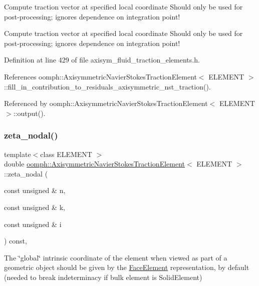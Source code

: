 Compute traction vector at specified local coordinate Should only be used for post-\/processing; ignores dependence on integration point! 

Compute traction vector at specified local coordinate Should only be used for post-\/processing; ignores dependence on integration point! 

Definition at line 429 of file axisym\+\_\+fluid\+\_\+traction\+\_\+elements.\+h.



References oomph\+::\+Axisymmetric\+Navier\+Stokes\+Traction\+Element$<$ E\+L\+E\+M\+E\+N\+T $>$\+::fill\+\_\+in\+\_\+contribution\+\_\+to\+\_\+residuals\+\_\+axisymmetric\+\_\+nst\+\_\+traction().



Referenced by oomph\+::\+Axisymmetric\+Navier\+Stokes\+Traction\+Element$<$ E\+L\+E\+M\+E\+N\+T $>$\+::output().

\mbox{\label{classoomph_1_1AxisymmetricNavierStokesTractionElement_a07065fabd6d28ac9efb7e50bc628a8e0}} 
\subsubsection{\texorpdfstring{zeta\+\_\+nodal()}{zeta\_nodal()}}
{\footnotesize\ttfamily template$<$class E\+L\+E\+M\+E\+NT $>$ \\
double \hyperlink{classoomph_1_1AxisymmetricNavierStokesTractionElement}{oomph\+::\+Axisymmetric\+Navier\+Stokes\+Traction\+Element}$<$ E\+L\+E\+M\+E\+NT $>$\+::zeta\+\_\+nodal (\begin{DoxyParamCaption}\item[{const unsigned \&}]{n,  }\item[{const unsigned \&}]{k,  }\item[{const unsigned \&}]{i }\end{DoxyParamCaption}) const\hspace{0.3cm}{\ttfamily [inline]}, {\ttfamily [virtual]}}



The \char`\"{}global\char`\"{} intrinsic coordinate of the element when viewed as part of a geometric object should be given by the \hyperlink{classoomph_1_1FaceElement}{Face\+Element} representation, by default (needed to break indeterminacy if bulk element is Solid\+Element) 

